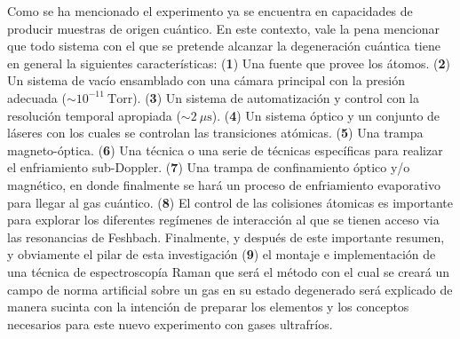 \documentclass[superscriptaddress,onecolumn,aps,preprint,showpacs,nofootinbib,pra,11pt]{revtex4-2}
\begin{document}
\begin{normalsize}
Como se ha mencionado el experimento ya se encuentra en capacidades de producir muestras de origen cuántico. En este contexto, vale la pena mencionar que todo sistema con el que se pretende alcanzar la degeneración cuántica tiene en general la siguientes características: (\textbf{1}) Una fuente que provee los átomos. (\textbf{2}) Un sistema de vacío ensamblado con una cámara principal con la presión adecuada ($\sim 10^{-11} ~\mathrm{Torr}$). (\textbf{3}) Un sistema de automatización y control con la resolución temporal apropiada ($\sim 2 ~ \mu \mathrm{s}$). (\textbf{4}) Un sistema óptico y un conjunto de láseres con los cuales se controlan las transiciones atómicas. (\textbf{5}) Una trampa magneto-óptica. (\textbf{6}) Una técnica o una serie de técnicas específicas para realizar el enfriamiento sub-Doppler. (\textbf{7}) Una trampa de confinamiento óptico y/o magnético, en donde finalmente se hará un proceso de enfriamiento evaporativo para llegar al gas cuántico. (\textbf{8}) El control de las colisiones \'atomicas es importante para explorar los diferentes regímenes de interacción al que se tienen acceso via las resonancias de Feshbach.  Finalmente, y después de este importante resumen, y obviamente el pilar de esta investigación (\textbf{9}) el montaje e implementación de una técnica de espectroscopía Raman que ser\'a el m\'etodo con el cual se crear\'a un campo de norma artificial sobre un gas en su estado degenerado será explicado de manera sucinta con la intención de preparar los elementos y los conceptos necesarios para este nuevo experimento con gases ultrafríos.\medskip


\end{normalsize}
\end{document}
